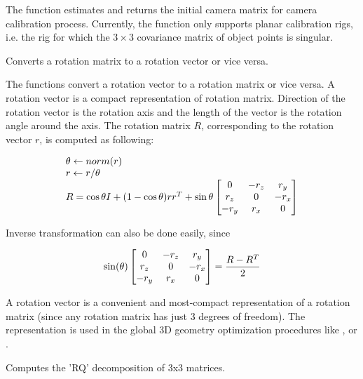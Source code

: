 The function estimates and returns the initial camera matrix for camera calibration process.
Currently, the function only supports planar calibration rigs, i.e. the rig for which the $3 \times 3$ covariance matrix of object points is singular.


Converts a rotation matrix to a rotation vector or vice versa.


\begin{description}
\end{description}

The functions convert a rotation vector to a rotation matrix or vice versa. A rotation vector is a compact representation of rotation matrix. Direction of the rotation vector is the rotation axis and the length of the vector is the rotation angle around the axis. The rotation matrix $R$, corresponding to the rotation vector $r$, is computed as following:

\[
\begin{array}{l}
\theta \leftarrow norm(r)\\
r \leftarrow r/\theta\\
R = \cos{\theta} I + (1-\cos{\theta}) r r^T + \sin{\theta}
\begin{bmatrix} 0 & -r_z & r_y\\ r_z & 0 & -r_x\\ -r_y & r_x & 0 \end{bmatrix}
\end{array}
\]

Inverse transformation can also be done easily, since

\[
\sin(\theta)
\begin{bmatrix} 0 & -r_z & r_y\\ r_z & 0 & -r_x\\ -r_y & r_x & 0 \end{bmatrix}
=
\frac{R - R^T}{2}
\]

A rotation vector is a convenient and most-compact representation of a rotation matrix
(since any rotation matrix has just 3 degrees of freedom). The representation is
used in the global 3D geometry optimization procedures like ,  or .


Computes the 'RQ' decomposition of 3x3 matrices.

